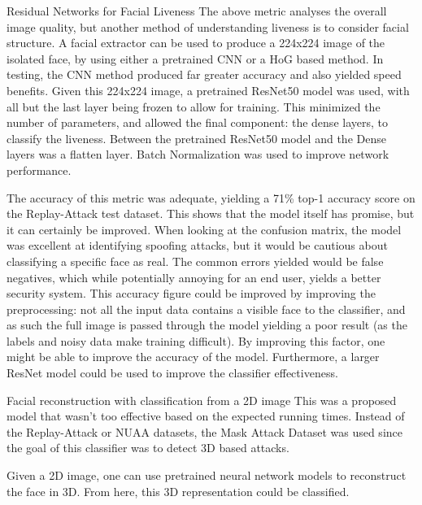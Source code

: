 \documentclass[final]{beamer}
\begin{document}
\begin{frame}{}
\begin{columns}[t]
\begin{column}{.48\linewidth}
        \begin{block}{Residual Networks for Facial Liveness}
            The above metric analyses the overall image quality, but another method of understanding liveness is to consider facial structure. A facial extractor can be used to produce
            a 224x224 image of the isolated face, by using either a pretrained CNN or a HoG based method. In testing, the CNN method produced far greater accuracy and also yielded speed benefits.
            Given this 224x224 image, a pretrained ResNet50 model was used, with all but the last layer being frozen to allow for training. This minimized the number of parameters, and allowed
            the final component: the dense layers, to classify the liveness. Between the pretrained ResNet50 model and the Dense layers was a flatten layer. Batch Normalization was used to improve
            network performance.

            The accuracy of this metric was adequate, yielding a 71\% top-1 accuracy score on the Replay-Attack test dataset. This shows that the model itself has promise, but it can certainly be improved.
            When looking at the confusion matrix, the model was excellent at identifying spoofing attacks, but it would be cautious about classifying a specific face as real. The common errors yielded would be
            false negatives, which while potentially annoying for an end user, yields a better security system. This accuracy figure could be improved by improving the preprocessing: not all the input data
            contains a visible face to the classifier, and as such the full image is passed through the model yielding a poor result (as the labels and noisy data make training difficult). By improving this factor,
            one might be able to improve the accuracy of the model. Furthermore, a larger ResNet model could be used to improve the classifier effectiveness.

        \end{block}

        \begin{block}{Facial reconstruction with classification from a 2D image}
          This was a proposed model that wasn't too effective based on the expected running times. Instead of the Replay-Attack or NUAA datasets,
          the Mask Attack Dataset was used since the goal of this classifier was to detect 3D based attacks.

          Given a 2D image, one can use pretrained neural network models to reconstruct the face in 3D. From here, this 3D representation could be
          classified.


\end{block}
\end{column}
\end{columns}
\end{frame}
\end{document}
